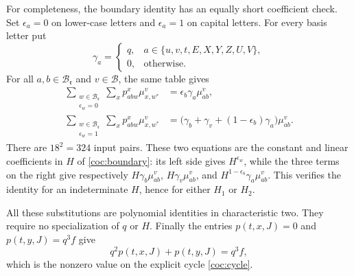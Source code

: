 For completeness, the boundary identity has an equally short
coefficient check.  Set $\epsilon_a=0$ on lower-case letters and
$\epsilon_a=1$ on capital letters.  For every basis letter put
\[
 \gamma_a=
 \begin{cases}
 q,&a\in\{u,v,t,E,X,Y,Z,U,V\},\\
 0,&\text{otherwise}.
 \end{cases}
\]
For all $a,b\in\mathcal B_{\mathfrak r}$ and $v\in\mathcal B$, the
same table gives
\begin{align}
 \sum_{\substack{w\in\mathcal B_{\mathfrak r}\\\epsilon_w=0}}
       \sum_x p_{abw}^{x}\mu_{x,w^*}^{v}
 &=\epsilon_b\gamma_a\mu_{ab}^{v},
 \label{coc:boundary-constant}\\
 \sum_{\substack{w\in\mathcal B_{\mathfrak r}\\\epsilon_w=1}}
       \sum_x p_{abw}^{x}\mu_{x,w^*}^{v}
 &=\bigl(\gamma_b+\gamma_v+(1-\epsilon_b)\gamma_a\bigr)
       \mu_{ab}^{v}.
 \label{coc:boundary-linear}
\end{align}
There are $18^2=324$ input pairs.  These two equations are the
constant and linear coefficients in $H$ of
\eqref{coc:boundary}: its left side gives $H^{\epsilon_w}$, while
the three terms on the right give respectively
$H\gamma_b\mu_{ab}^{v}$, $H\gamma_v\mu_{ab}^{v}$, and
$H^{1-\epsilon_b}\gamma_a\mu_{ab}^{v}$.  This verifies the identity
for an indeterminate $H$, hence for either $H_1$ or $H_2$.

All these substitutions are polynomial identities in characteristic
two.  They require no specialization of $q$ or $H$.  Finally the
entries $p(t,x,J)=0$ and $p(t,y,J)=q^3f$ give
\[
 q^2p(t,x,J)+p(t,y,J)=q^3f,
\]
which is the nonzero value on the explicit cycle
\eqref{coc:cycle}.
